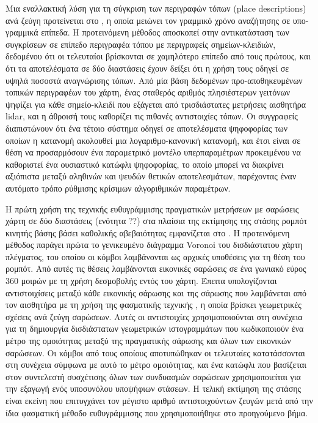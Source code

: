 Μια εναλλακτική λύση για τη σύγκριση των περιγραφών τόπων (place descriptions)
ανά ζεύγη προτείνεται στο \cite{Bosse2013}, η οποία μειώνει τον γραμμικό χρόνο
αναζήτησης σε υπο-γραμμικά επίπεδα. Η προτεινόμενη μέθοδος αποσκοπεί στην
αντικατάσταση των συγκρίσεων σε επίπεδο περιγραφέα τόπου με περιγραφείς
σημείων-κλειδιών, δεδομένου ότι οι τελευταίοι βρίσκονται σε χαμηλότερο επίπεδο
από τους πρώτους, και ότι τα αποτελέσματα σε δύο διαστάσεις έχουν δείξει ότι η
χρήση τους οδηγεί σε υψηλά ποσοστά αναγνώρισης τόπων. Από μία βάση δεδομένων
προ-αποθηκευμένων τοπικών περιγραφέων του χάρτη, ένας σταθερός αριθμός
πλησιέστερων γειτόνων ψηφίζει για κάθε σημείο-κλειδί που εξάγεται από
τρισδιάστατες μετρήσεις αισθητήρα lidar, και η άθροισή τους καθορίζει τις πιθανές
αντιστοιχίες τόπων. Οι συγγραφείς διαπιστώνουν ότι ένα τέτοιο σύστημα οδηγεί σε
αποτελέσματα ψηφοφορίας των οποίων η κατανομή ακολουθεί μια λογαριθμο-κανονική
κατανομή, και έτσι είναι σε θέση να προσαρμόσουν ένα παραμετρικό μοντέλο
υπερπαραμέτρων προκειμένου να καθοριστεί ένα ουσιαστικό κατώφλι ψηφοφορίας, το
οποίο μπορεί να διακρίνει αξιόπιστα μεταξύ αληθινών και ψευδών θετικών
αποτελεσμάτων, παρέχοντας έναν αυτόματο τρόπο ρύθμισης κρίσιμων αλγοριθμικών
παραμέτρων.

Η πρώτη χρήση της τεχνικής ευθυγράμμισης πραγματικών μετρήσεων με σαρώσεις
χάρτη σε δύο διαστάσεις (ενότητα ??) στα πλαίσια της εκτίμησης της στάσης
ρομπότ κινητής βάσης βάσει καθολικής αβεβαιότητας εμφανίζεται στο
\cite{Park2014a}. Η προτεινόμενη μέθοδος παράγει πρώτα το γενικευμένο διάγραμμα
Voronoi του δισδιάστατου χάρτη πλέγματος, του οποίου οι κόμβοι λαμβάνονται ως
αρχικές υποθέσεις για τη θέση του ρομπότ. Από αυτές τις θέσεις λαμβάνονται
εικονικές σαρώσεις σε ένα γωνιακό εύρος $360$ μοιρών με τη χρήση δεσμοβολής
εντός του χάρτη. Έπειτα υπολογίζονται αντιστοιχίσεις μεταξύ κάθε εικονικής
σάρωσης και της σάρωσης που λαμβάνεται από τον αισθητήρα με τη χρήση της
φασματικής τεχνικής \cite{Leordeanu2005a}, η οποία βρίσκει γεωμετρικές σχέσεις
ανά ζεύγη σαρώσεων. Αυτές οι αντιστοιχίες χρησιμοποιούνται στη συνέχεια για τη
δημιουργία δισδιάστατων γεωμετρικών ιστογραμμάτων που κωδικοποιούν ένα μέτρο
της ομοιότητας μεταξύ της πραγματικής σάρωσης και όλων των εικονικών σαρώσεων.
Οι κόμβοι από τους οποίους αποτυπώθηκαν οι τελευταίες κατατάσσονται στη
συνέχεια σύμφωνα με αυτό το μέτρο ομοιότητας, και ένα κατώφλι που βασίζεται
στον συντελεστή συσχέτισης όλων των συνδυασμών σαρώσεων χρησιμοποιείται για την
εξαγωγή ενός υποσυνόλου υποψήφιων στάσεων. Η τελική εκτίμηση της στάσης είναι
εκείνη που επιτυγχάνει τον μέγιστο αριθμό αντιστοιχούντων ζευγών μετά από την
ίδια φασματική μέθοδο ευθυγράμμισης που χρησιμοποιήθηκε στο προηγούμενο βήμα.

